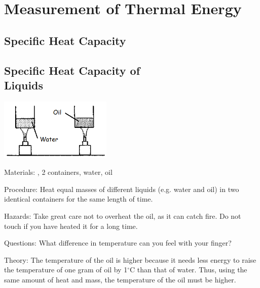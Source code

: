 \section{Measurement of Thermal Energy} 

\begin{multicols}{2}


\section*{Specific Heat Capacity}  


\subsection[Specific Heat Capacity of Liquids]{Specific Heat Capacity of \hfill \\ Liquids}

\begin{center}
\includegraphics[width=0.4\textwidth]{./img/source/shc-liquids.png}
\end{center}

\begin{description*}
\item[Materials:]{, 2 containers, water, oil}
\item[Procedure:]{Heat equal masses of different liquids (e.g. water and oil) in two identical containers for the same length of time.}
\item[Hazards:]{Take great care not to overheat the oil, as it can catch fire. Do not touch if you have heated it for a long time.}
\item[Questions:]{What difference in temperature can you feel with your finger?}
\item[Theory:]{The temperature of the oil is higher because it needs less energy to raise the temperature of one gram of oil by 1$^\circ$C than that of water. Thus, using the same amount of heat and mass, the temperature of the oil must be higher.}
\end{description*}


\end{multicols}
